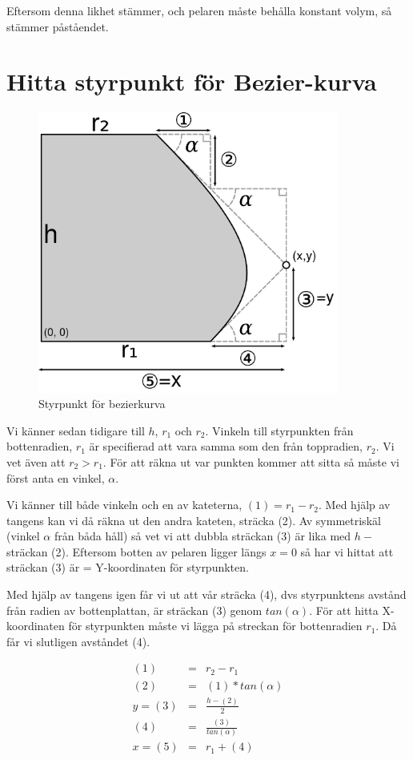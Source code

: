 \documentclass[a4paper,10pt]{article}
\begin{document}
	Eftersom denna likhet stämmer, och pelaren måste behålla konstant volym, så stämmer påståendet.

\section {Hitta styrpunkt för Bezier-kurva}
	\begin{figure}[htp]
	\centering
	\includegraphics[width=280pt]{styrpunkt}
	\caption{Styrpunkt för bezierkurva}\label{fig:styrpunkt}
	\end{figure}

	Vi känner sedan tidigare till $h$, $r_1$ och $r_2$. Vinkeln till styrpunkten från bottenradien, $r_1$ är specifierad att vara samma som den från toppradien, $r_2$. Vi vet även att $r_2>r_1$. För att räkna ut var punkten kommer att sitta så måste vi först anta en vinkel, $\alpha$.

	Vi känner till både vinkeln och en av kateterna, $(1) = r_1-r_2$. Med hjälp av tangens kan vi då räkna ut den andra kateten, sträcka (2). Av symmetriskäl (vinkel $\alpha$ från båda håll) så vet vi att dubbla sträckan (3) är lika med $h-$ sträckan (2). Eftersom botten av pelaren ligger längs $x=0$ så har vi hittat att sträckan (3) är = Y-koordinaten för styrpunkten.

	Med hjälp av tangens igen får vi ut att vår sträcka (4), dvs styrpunktens avstånd från radien av bottenplattan, är sträckan (3) genom $tan(\alpha)$. För att hitta X-koordinaten för styrpunkten måste vi lägga på streckan för bottenradien $r_1$. Då får vi slutligen avståndet (4).

	\begin{eqnarray*}
		(1) &=& r_2-r_1 \\
		(2) &=& (1)*tan(\alpha) \\
	    y = (3) &=& \frac{h-(2)}{2} \\
		(4) &=& \frac{(3)}{tan(\alpha)} \\
	    x = (5) &=& r_1 + (4)
	\end{eqnarray*}
\end{document}
